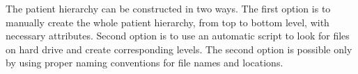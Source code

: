 The patient hierarchy can be constructed in two ways. The first option is to manually create the whole patient hierarchy, from top to bottom level, with necessary attributes. Second option is to use an automatic script to look 
for files on hard drive and create corresponding levels. The second option is possible only by using proper naming conventions for file names and locations.



